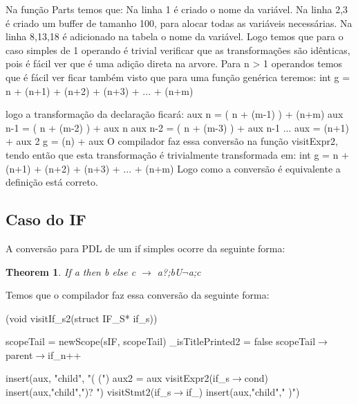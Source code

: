 \documentclass{article}
\newtheorem{theorem}{Theorem}
\begin{document}
	Na função Parts temos que:
	\BlankLine
	Na linha 1 é criado o nome da variável. 
	Na linha 2,3  é criado um buffer de tamanho 100, para alocar todas as variáveis necessárias.
	Na linha 8,13,18 é adicionado na tabela o nome da variável.
	\BlankLine
	Logo temos que para o caso simples de 1 operando é trivial verificar que as transformações são idênticas, pois é fácil ver que é uma adição direta na arvore. Para n > 1 operandos temos que é fácil ver ficar também visto que para uma função genérica teremos:
	\BlankLine
	int g = n + (n+1) + (n+2) + (n+3) + ... + (n+m)
	\BlankLine
	
logo a transformação da declaração ficará: 
	\BlankLine
	aux n   = ( n + (m-1) ) + (n+m)  
	aux n-1 = ( n + (m-2) ) + aux n 
	aux n-2 = ( n + (m-3) ) + aux n-1 
	... 
	aux = (n+1) + aux 2 
	\BlankLine
	g = (n) + aux 
	\BlankLine
	O compilador faz essa conversão na função visitExpr2, tendo então que esta transformação é trivialmente transformada em: 
	\BlankLine
	int g = n + (n+1) + (n+2) + (n+3) + ... + (n+m)
	\BlankLine
	Logo como a conversão é equivalente a definição está correto.
	\BlankLine


	\subsection{Caso do IF}
		A conversão para PDL de um if simples ocorre da seguinte forma:
			\begin{theorem}
		If a then b else c $\rightarrow$ a?;bU$\neg$a;c
			\end{theorem}
	
	Temos que o compilador faz essa conversão da seguinte forma:
	
	\begin{algorithm}
		\caption{(void visitIf\_s2(struct IF\_S* if\_s))}
		scopeTail = newScope(sIF, scopeTail)\;
		\_isTitlePrinted2 = false\;
		scopeTail$\rightarrow$parent$\rightarrow$if\_n++\;
		
		insert(aux, "child", "( (")\;
		aux2 = aux\;
		visitExpr2(if\_s$\rightarrow$cond)\;
		insert(aux,"child",")? ")\;
		visitStmt2(if\_s$\rightarrow$if\_)\;
		insert(aux,"child"," )")\;
	\end{algorithm}
\end{document}
